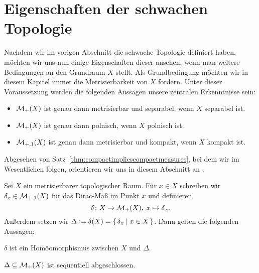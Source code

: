 \documentclass[../main/main.tex]{subfiles}
\begin{document}
	
	\section{Eigenschaften der schwachen Topologie}
	
	Nachdem wir im vorigen Abschnitt die schwache Topologie definiert haben, möchten wir uns nun einige Eigenschaften dieser ansehen, wenn man weitere Bedingungen an den Grundraum $X$ stellt. 
	Als Grundbedingung möchten wir in diesem Kapitel immer die Metrisierbarkeit von $X$ fordern.
	Unter dieser Voraussetzung werden die folgenden Aussagen unsere zentralen Erkenntnisse sein:
	\vspace*{0.5em}
	\begin{itemize}
		\item $\mathcal{M}_{+}(X)$ ist genau dann metrisierbar und separabel, wenn $X$ separabel ist.
		\item $\mathcal{M}_{+}(X)$ ist genau dann polnisch, wenn $X$ polnisch ist.
		\item $\mathcal{M}_{+,1}(X)$ ist genau dann metrisierbar und kompakt, wenn $X$ kompakt ist.
	\end{itemize}
	\vspace*{0.5em}
	Abgesehen von Satz~\ref{thm:compactimpliescompactmeasures}, bei dem wir im Wesentlichen \cite{vanGaans.200203} folgen, orientieren wir uns in diesem Abschnitt an \cite{Varadarajan.1958}.
	
	\begin{Satz}
		\label{thm:embeddingdiracmeasures}
		Sei $X$ ein metrisierbarer topologischer Raum. Für $x \in X$ schreiben wir $\delta_x \in \mathcal{M}_{+,1}(X)$ für das Dirac-Maß im Punkt $x$ und definieren
		\[ \delta \colon X \to \mathcal{M}_{+}(X), \; x \mapsto \delta_x  \text{.} \]
		Außerdem setzen wir $\Delta \vcentcolon = \delta(X) = \left\{\, \delta_x \; \middle| \; x \in X \,\right\}$. Dann gelten die folgenden Aussagen:
		\begin{enumeratethm}
			\item $\delta$ ist ein Homöomorphismus zwischen $X$ und $\Delta$.
			\item $\Delta \subseteq \mathcal{M}_{+}(X)$ ist sequentiell abgeschlossen.
		\end{enumeratethm}
	\end{Satz}
\end{document}
